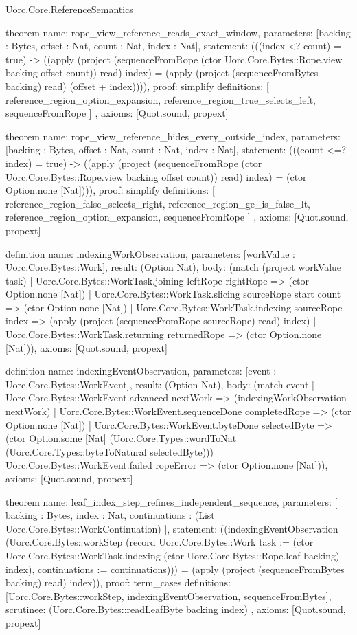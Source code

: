 \begin{lexlean}{Uorc.Core.ReferenceSemantics}
\begin{semanticmodule}
theorem{
  name: rope_view_reference_reads_exact_window,
  parameters: [backing : Bytes, offset : Nat, count : Nat, index : Nat],
  statement: (((index <? count) = true) -> ((apply (project (sequenceFromRope (ctor Uorc.Core.Bytes::Rope.view backing offset count)) read) index) = (apply (project (sequenceFromBytes backing) read) (offset + index)))),
  proof: simplify{
    definitions: [
      reference_region_option_expansion,
      reference_region_true_selects_left,
      sequenceFromRope
    ]
  },
  axioms: [Quot.sound, propext]
}

theorem{
  name: rope_view_reference_hides_every_outside_index,
  parameters: [backing : Bytes, offset : Nat, count : Nat, index : Nat],
  statement: (((count <=? index) = true) -> ((apply (project (sequenceFromRope (ctor Uorc.Core.Bytes::Rope.view backing offset count)) read) index) = (ctor Option.none [Nat]))),
  proof: simplify{
    definitions: [
      reference_region_false_selects_right,
      reference_region_ge_is_false_lt,
      reference_region_option_expansion,
      sequenceFromRope
    ]
  },
  axioms: [Quot.sound, propext]
}

definition{
  name: indexingWorkObservation,
  parameters: [workValue : Uorc.Core.Bytes::Work],
  result: (Option Nat),
  body: (match (project workValue task)
    | Uorc.Core.Bytes::WorkTask.joining leftRope rightRope => (ctor Option.none [Nat])
    | Uorc.Core.Bytes::WorkTask.slicing sourceRope start count => (ctor Option.none [Nat])
    | Uorc.Core.Bytes::WorkTask.indexing sourceRope index => (apply (project (sequenceFromRope sourceRope) read) index)
    | Uorc.Core.Bytes::WorkTask.returning returnedRope => (ctor Option.none [Nat])),
  axioms: [Quot.sound, propext]
}

definition{
  name: indexingEventObservation,
  parameters: [event : Uorc.Core.Bytes::WorkEvent],
  result: (Option Nat),
  body: (match event
    | Uorc.Core.Bytes::WorkEvent.advanced nextWork => (indexingWorkObservation nextWork)
    | Uorc.Core.Bytes::WorkEvent.sequenceDone completedRope => (ctor Option.none [Nat])
    | Uorc.Core.Bytes::WorkEvent.byteDone selectedByte => (ctor Option.some [Nat] (Uorc.Core.Types::wordToNat (Uorc.Core.Types::byteToNatural selectedByte)))
    | Uorc.Core.Bytes::WorkEvent.failed ropeError => (ctor Option.none [Nat])),
  axioms: [Quot.sound, propext]
}

theorem{
  name: leaf_index_step_refines_independent_sequence,
  parameters: [
    backing : Bytes,
    index : Nat,
    continuations : (List Uorc.Core.Bytes::WorkContinuation)
  ],
  statement: ((indexingEventObservation (Uorc.Core.Bytes::workStep (record Uorc.Core.Bytes::Work {task := (ctor Uorc.Core.Bytes::WorkTask.indexing (ctor Uorc.Core.Bytes::Rope.leaf backing) index), continuations := continuations}))) = (apply (project (sequenceFromBytes backing) read) index)),
  proof: term_cases{
    definitions: [Uorc.Core.Bytes::workStep, indexingEventObservation, sequenceFromBytes],
    scrutinee: (Uorc.Core.Bytes::readLeafByte backing index)
  },
  axioms: [Quot.sound, propext]
}


\end{semanticmodule}
\end{lexlean}
